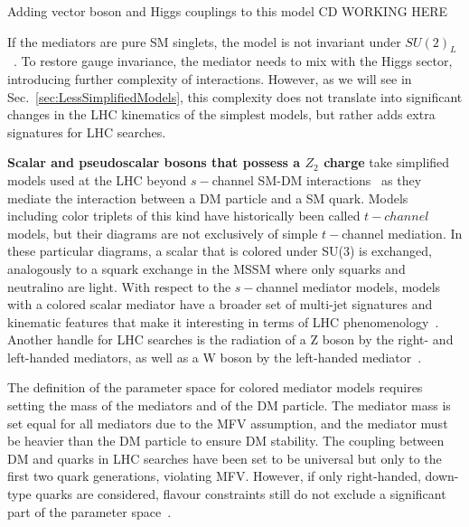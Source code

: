 Adding vector boson and Higgs couplings to this model CD WORKING HERE

If the mediators are pure SM singlets, the model is not invariant under $SU(2)_L$~\cite{Bell:2016ekl}. 
To restore gauge invariance, the mediator needs to mix with the Higgs sector, introducing further complexity of interactions. However, as we will see in Sec.~\ref{sec:LessSimplifiedModels}, this complexity does not translate into significant changes in the LHC kinematics of the simplest models, but rather adds extra signatures for LHC searches.

\textbf{Scalar and pseudoscalar bosons that possess a $Z_2$ charge} take simplified models used at the LHC beyond $s-$channel SM-DM interactions~\cite{Bai:2013iqa, Papucci:2014iwa, An:2013xka, Bell:2012rg} as they mediate the interaction between a DM particle and a SM quark. Models including color triplets of this kind have historically been called $t-channel$ models, but their diagrams are not exclusively of simple $t-$channel mediation. In these particular diagrams, a scalar that is colored under SU(3) is exchanged, analogously to a squark exchange in the MSSM where only squarks and neutralino are light.
With respect to the $s-$channel mediator models, models with a colored scalar mediator have a broader set of multi-jet signatures and kinematic features that make it interesting in terms of LHC phenomenology~\cite{Abercrombie:2015wmb}. %
Another handle for LHC searches is the radiation of a Z boson by the right- and left-handed mediators, as well as a W boson by the left-handed mediator~\cite{Bell:2012rg}. 

The definition of the parameter space for colored mediator models requires setting the mass of the mediators and of the DM particle. The mediator mass is set equal for all mediators due to the MFV assumption, and the mediator must be heavier than the DM particle to ensure DM stability. 
The coupling between DM and quarks \gdmq in LHC searches have been set to be universal but only to the first two quark generations, violating MFV. 
However, if only right-handed, down-type quarks are considered, flavour constraints still do not exclude a significant part of the parameter space~\cite{Abercrombie:2015wmb}. 

